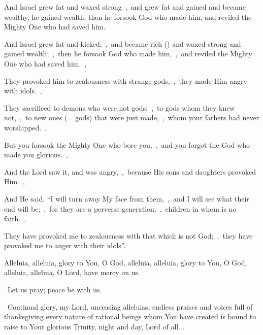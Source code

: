 \documentclass[12pt,twoside,a5paper]{article}
\begin{document}
\begin{halfparskip}
  And Israel grew fat and waxed strong~\sep\ and grew fat and gained and became wealthy, he gained wealth; then he forsook God who made him, and reviled the Mighty One who had saved him.

  And Israel grew fat and kicked;~\sep\ and became rich () and waxed strong and gained wealth;~\sep\ then he forsook God who made him,~\sep\ and reviled the Mighty One who had saved him.~\sep

  They provoked him to zealousness with strange gods,~\sep\ they made Him angry with idols.~\sep

  They sacrificed to demons who were not gods;~\sep\ to gods whom they knew not,~\sep\ to new ones (= gods) that were just made,~\sep\ whom your fathers had never worshipped.~\sep

  But you forsook the Mighty One who bore you,~\sep\ and you forgot the God who made you glorious.~\sep

  And the Lord saw it, and was angry,~\sep\ because His sons and daughters provoked Him.~\sep

  And He said, ``I will turn away My face from them,~\sep\ and I will see what their end will be;~\sep\ for they are a perverse generation,~\sep\ children in whom is no faith.~\sep

  They have provoked me to zealousness with that which is not God;~\sep\ they have provoked me to anger with their idols''.
\end{halfparskip}


\begin{halfparskip}
  Alleluia, alleluia, glory to You, O God, alleluia, alleluia, glory to You, O God, alleluia, alleluia, O Lord, have mercy on us.
\end{halfparskip}

\dd~Let us pray; peace be with us.

\cc~Continual glory, my Lord, unceasing alleluias, endless praises and voices full of thanksgiving every nature of rational beings whom You have created is bound to raise to Your glorious Trinity, night and day, Lord of all...

\end{document}
